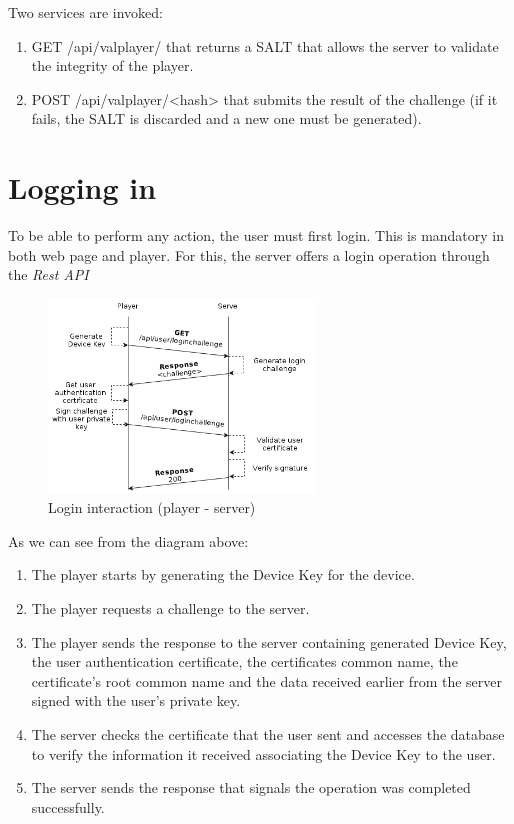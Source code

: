 \documentclass[11pt,a4paper]{report}
\begin{document}
Two services are invoked:  
\begin{enumerate}
\item GET   /api/valplayer/ that returns a SALT that allows the server to validate the integrity of the player.
\item POST  /api/valplayer/<hash> that submits the result of the challenge (if it fails, the SALT is discarded and a new one must be generated).
\end{enumerate}

\section{Logging in}
To be able to perform any action, the user must first login. This is mandatory in both web page and player.
\newline For this, the server offers a login operation through the \emph{Rest API}

\begin{figure}[H]
\centerline{\includegraphics[width=200pt]{images/loginDiagram.png}}
\caption{Login interaction (player - server)}
\label{player}
\end{figure}

As we can see from the diagram above:
\begin{enumerate}
  \item The player starts by generating the Device Key for the device. \label{sec:diagfile}
  \item The player requests a challenge to the server.
  \item The player sends the response to the server containing generated Device Key, the user authentication certificate, the certificates common name, the certificate's root common name and the data received earlier from the server signed with the user's private key. 
  \item The server checks the certificate that the user sent and accesses the database to verify the information it received associating the Device Key to the user.
  \item The server sends the response that signals the operation was completed successfully.
\end{enumerate}
\end{document}
